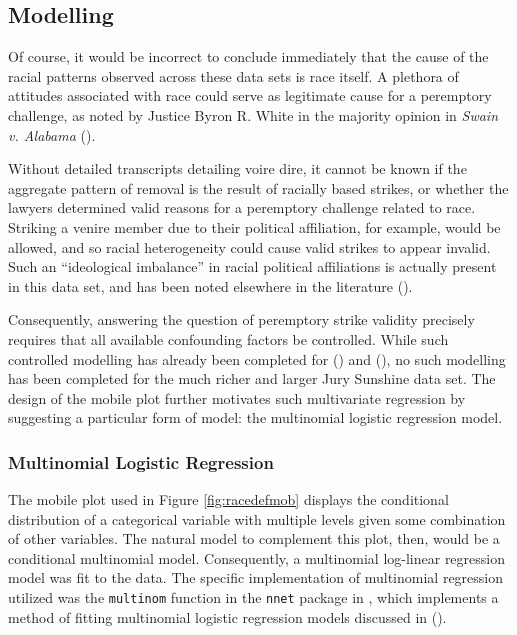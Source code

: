 \subsection{Modelling} \label{sec:mods}

Of course, it would be incorrect to conclude immediately that the cause of the racial patterns observed across these data sets is
race itself. A plethora of attitudes associated with race could serve as legitimate cause for a peremptory
challenge, as noted by Justice Byron R. White in the majority opinion in \textit{Swain v. Alabama} (\cite{swainvalabama}).

Without detailed transcripts detailing voire dire, it cannot be known if the aggregate pattern of removal is the result of racially based strikes, or whether the lawyers
determined valid reasons for a peremptory challenge related to race. Striking a venire member due to their political affiliation, for example, would be allowed, and so racial heterogeneity could cause valid strikes to appear invalid. Such an ``ideological imbalance'' in racial political affiliations is actually present in this data set, and has been noted elsewhere in the literature (\cite{revesz2016}).

Consequently, answering the question of peremptory strike validity precisely requires that all available confounding factors be controlled. While such controlled modelling has already been completed for (\cite{StubbornLegacy}) and (\cite{PerempChalMurder}), no such modelling has been completed for the much richer and larger Jury Sunshine data set. The design of the mobile plot further motivates such multivariate regression by suggesting a particular form of model: the multinomial logistic regression model.

\subsubsection{Multinomial Logistic Regression}

The mobile plot used in Figure \ref{fig:racedefmob} displays the
conditional distribution of a categorical variable with multiple
levels given some combination of other variables. The natural model to
complement this plot, then, would be a conditional multinomial
model. Consequently, a multinomial log-linear regression
model was fit to the data. The specific implementation of multinomial regression utilized was the
\texttt{multinom} function in the \texttt{nnet} package in \R, which implements a method of fitting multinomial logistic regression models discussed
in (\cite{nnet}).

